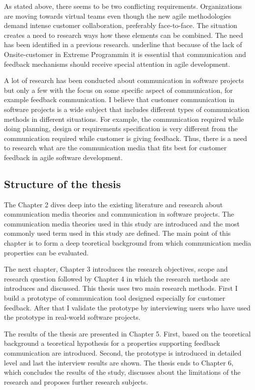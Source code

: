 \documentclass[english,12pt,a4paper,pdftex]{article}
\begin{document}
As stated above, there seems to be two conflicting requirements. Organizations are moving towards virtual teams even though the new agile methodologies demand intense customer collaboration, preferably face-to-face. The situation creates a need to research ways how these elements can be combined. The need has been identified in a previous research. \citet{korkala2006} underline that because of the lack of Onsite-customer in Extreme Programmin it is essential that communication and feedback mechanisms should receive special attention in agile development.

A lot of research has been conducted about communication in software projects but only a few with the focus on some specific aspect of communication, for example feedback communication. I believe that customer communication in software projects is a wide subject that includes different types of communication methods in different situations. For example, the communication required while doing planning, design or requirements specification is very different from the communication required while customer is giving feedback. Thus, there is a need to research what are the communication media that fits best for customer feedback in agile software development.

\subsection{Structure of the thesis}

The Chapter 2 dives deep into the existing literature and research about communication media theories and communication in software projects. The communication media theories used in this study are introduced and the most commonly used term used in this study are defined. The main point of this chapter is to form a deep teoretical background from which communication media properties can be evaluated.

The next chapter, Chapter 3 introduces the research objectives, scope and research question followed by Chapter 4 in which the research methods are introduces and discussed. This thesis uses two main research methods. First I build a  prototype of communication tool designed especially for customer feedback. After that I validate the prototype by interviewing users who have used the prototype in real-world software projects.

The results of the thesis are presented in Chapter 5. First, based on the teoretical background a teoretical hypothesis for a properties supporting feedback communication are introduced. Second, the prototype is introduced in detailed level and last the interview results are shown. The thesis ends to Chapter 6, which concludes the results of the study, discusses about the limitations of the research and proposes further research subjects.
\end{document}
